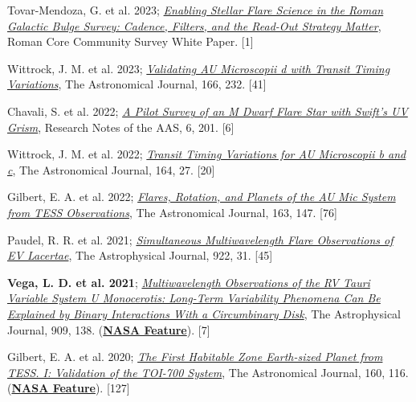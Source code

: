 \documentclass[12pt]{article}
\begin{document}
\begin{etaremune}
\item {Tovar-Mendoza, G. et al. 2023}; \href{https://ui.adsabs.harvard.edu/abs/2023arXiv230705806T/abstract}{\it Enabling Stellar Flare Science in the Roman Galactic Bulge Survey: Cadence, Filters, and the Read-Out Strategy Matter}, Roman Core Community Survey White Paper. [1]

\item {Wittrock, J. M. et al. 2023}; \href{https://ui.adsabs.harvard.edu/abs/2023AJ....166..232W/abstract}{\it Validating AU Microscopii d with Transit Timing Variations}, The Astronomical Journal, 166, 232. [41]

\item {Chavali, S. et al. 2022}; \href{https://ui.adsabs.harvard.edu/abs/2022RNAAS...6..201C/abstract}{\it A Pilot Survey of an M Dwarf Flare Star with Swift’s UV Grism}, Research Notes of the AAS, 6, 201. [6]

\item {Wittrock, J. M. et al. 2022}; \href{https://ui.adsabs.harvard.edu/abs/2022AJ....164...27W/abstract}{\it Transit Timing Variations for AU Microscopii b and c}, The Astronomical Journal, 164, 27. [20]

\item {Gilbert, E. A. et al. 2022}; \href{https://ui.adsabs.harvard.edu/abs/2022AJ....163..147G/abstract}{\it Flares, Rotation, and Planets of the AU Mic System from TESS Observations}, The Astronomical Journal, 163, 147. [76]

\item {Paudel, R. R. et al. 2021}; \href{https://ui.adsabs.harvard.edu/abs/2021ApJ...922...31P/abstract}{\it Simultaneous Multiwavelength Flare Observations of EV Lacertae}, The Astrophysical Journal, 922, 31. [45]

\item {\bf Vega, L. D. et al. 2021}; \href{https://ui.adsabs.harvard.edu/abs/2021ApJ...909..138V/abstract}{\it Multiwavelength Observations of the RV Tauri Variable System U Monocerotis: Long-Term Variability Phenomena Can Be Explained by Binary Interactions With a Circumbinary Disk}, The Astrophysical Journal, 909, 138. (\href{https://www.nasa.gov/feature/goddard/2021/scientists-sketch-aged-star-system-using-over-a-century-of-observations/}{\bf NASA Feature}). [7]

\item {Gilbert, E. A. et al. 2020}; \href{https://ui.adsabs.harvard.edu/abs/2020AJ....160..116G/abstract}{\it The First Habitable Zone Earth-sized Planet from TESS. I: Validation of the TOI-700 System}, The Astronomical Journal, 160, 116. (\href{https://www.nasa.gov/feature/goddard/2020/nasa-planet-hunter-finds-its-1st-earth-size-habitable-zone-world}{\bf NASA Feature}). [127]


\end{etaremune}
\end{document}
